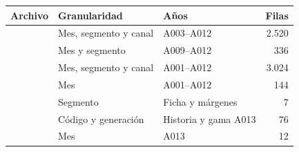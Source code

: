 \begin{tabularx}{\linewidth}{@{}p{.40\linewidth}Yp{2.6cm}r@{}}
\toprule
Archivo & Granularidad & Años & Filas \\
\midrule
{} & Mes, segmento y canal & A003--A012 & 2.520 \\
 & Mes y segmento & A009--A012 & 336 \\
 & Mes, segmento y canal & A001--A012 & 3.024 \\
 & Mes & A001--A012 & 144 \\
 & Segmento & Ficha y márgenes & 7 \\
 & Código y generación & Historia y gama A013 & 76 \\
 & Mes & A013 & 12 \\
\bottomrule
\end{tabularx}
